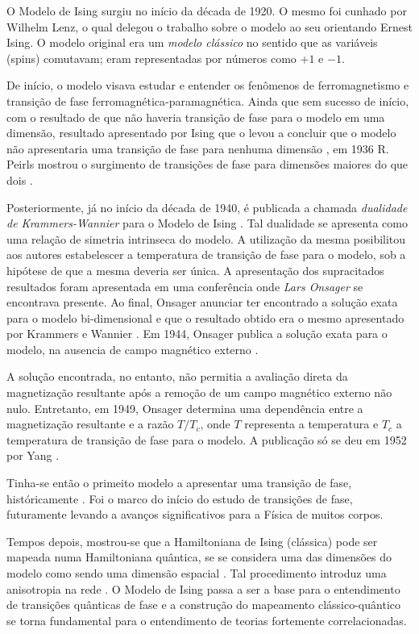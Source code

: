 O Modelo de Ising surgiu no início da década de 1920. O mesmo foi cunhado por Wilhelm Lenz, o qual delegou o trabalho sobre o modelo ao seu orientando Ernest Ising. O modelo original era um \textit{modelo clássico} no sentido que as variáveis (spins) comutavam; eram representadas por números como $+1$ e $-1$. \cite{IsingIntro}

De início, o modelo visava estudar e entender os fenômenos de ferromagnetismo e transição de fase ferromagnética-paramagnética. Ainda que sem sucesso de início, com o resultado de que não haveria transição de fase para o modelo em uma dimensão, resultado apresentado por Ising que o levou a concluir que o modelo não apresentaria uma transição de fase para nenhuma dimensão \cite{Ising}, em  1936 R. Peirls mostrou o surgimento de transições de fase para dimensões maiores do que dois \cite{Peierls-1936}. 

Posteriormente, já no início da década de 1940, é publicada a chamada \textit{dualidade de Krammers-Wannier} para o Modelo de Ising  \cite{Kramers-1941I, Kramers-1941II}. Tal dualidade se apresenta como uma relação de simetria intrinseca do modelo. A utilização da mesma posibilitou aos autores estabelescer a temperatura de transição de fase para o modelo, sob a hipótese de que a mesma deveria ser única. A apresentação dos supracitados resultados foram apresentada em uma conferência onde \textit{Lars Onsager} se encontrava presente. Ao final, Onsager anunciar ter encontrado a solução exata para o modelo bi-dimensional e que o resultado obtido era o mesmo apresentado por Krammers e Wannier \cite{FiftyYears}. Em 1944, Onsager publica a solução exata para o modelo, na ausencia de campo magnético externo \cite{Onsager1944}. 

A solução encontrada, no entanto, não permitia a avaliação direta da magnetização resultante após a remoção de um campo magnético externo não nulo. Entretanto, em 1949, Onsager determina uma dependência entre a magnetização resultante e a razão $T/T_c$, onde $T$ representa a temperatura e $T_c$ a temperatura de transição de fase para o modelo. A publicação só se deu em 1952 por Yang \cite{Yang}. 

Tinha-se então o primeito modelo a apresentar uma transição de fase, históricamente \cite{FiftyYears}. Foi o marco do início do estudo de transições de fase, futuramente levando a avanços significativos para a Física de muitos corpos.


Tempos depois, mostrou-se que a Hamiltoniana de Ising (clássica) pode ser mapeada numa Hamiltoniana quântica, se se considera uma das dimensões do modelo como sendo uma dimensão espacial \cite{KogutMain, FradSussk}. Tal procedimento introduz uma anisotropia na rede \cite{KogutMain, FradSussk}. O Modelo de Ising passa a ser a base para o entendimento de transições quânticas de fase e a construção do mapeamento clássico-quântico se torna fundamental para o entendimento de teorias fortemente correlacionadas. 

